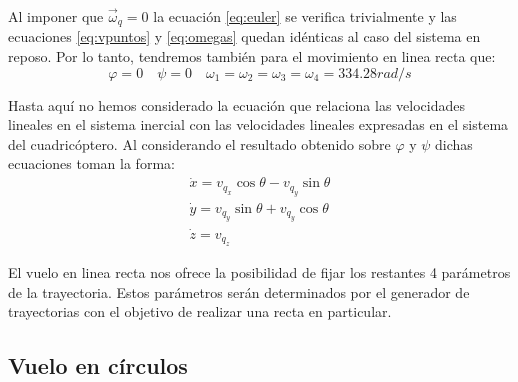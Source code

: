 \documentclass[main]{subfiles}
\begin{document}
Al imponer que $\vec{\omega}_q=0$ la ecuaci\'on \ref{eq:euler} se verifica trivialmente y las ecuaciones \ref{eq:vpuntos} y \ref{eq:omegas} quedan id\'enticas al caso del sistema en reposo. Por lo tanto, tendremos tambi\'en para el movimiento en linea recta que:
\begin{equation}
\varphi=0 \quad \psi=0 \quad \omega_1=\omega_2=\omega_3=\omega_4 = 334.28 rad/s
\end{equation}

Hasta aqu\'i no hemos considerado la ecuaci\'on que relaciona las velocidades lineales en el sistema inercial con las velocidades lineales expresadas en el sistema del cuadric\'optero. Al considerando el resultado obtenido sobre $\varphi$ y $\psi$ dichas ecuaciones toman la forma:
\begin{equation}\begin{array}{c}
\dot{x}=v_{q_x}\cos\theta-v_{q_y}\sin\theta\\
\dot{y}=v_{q_y}\sin\theta+v_{q_y}\cos\theta\\
\dot{z}=v_{q_z}
\end{array}
\end{equation} 

El vuelo en linea recta nos ofrece la posibilidad de fijar los restantes 4 par\'ametros de la trayectoria. Estos par\'ametros ser\'an determinados por el generador de trayectorias con el objetivo de realizar una recta en particular. 

\subsection{Vuelo en c\'irculos}
\end{document}
